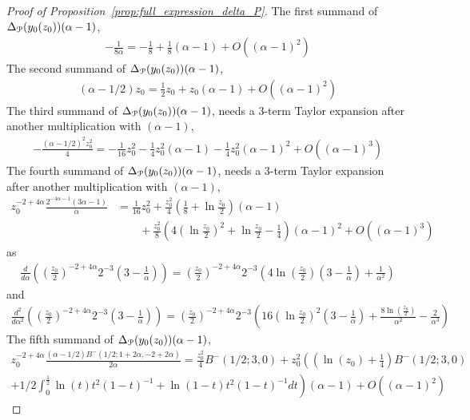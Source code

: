 \begin{proof}[Proof of Proposition~\ref{prop:full_expression_delta_P}]
The first summand of $\Delta_{{\mathcal P}}(y_0(z_0))(\alpha-1)$,
\begin{align*}
-\frac{1}{8 \alpha} = -\frac{1}{8}+\frac{1}{8}(\alpha-1) +O( (\alpha-1)^2)
\end{align*}
The second summand of $\Delta_{{\mathcal P}}(y_0(z_0))(\alpha-1)$,
\begin{align*}
(\alpha-1/2)z_0 = \frac{1}{2}z_0 +z_0 (\alpha-1)+O( (\alpha-1)^2)
\end{align*}
The third summand of $\Delta_{{\mathcal P}}(y_0(z_0))(\alpha-1)$, needs a 3-term Taylor expansion after another multiplication with $(\alpha-1)$,
\begin{align*}
- \frac{(\alpha - 1/2)^2 z_0^2}{4} = -\frac{1}{16}z_0^2 -\frac{1}{4}z_0^2(\alpha-1)-\frac{1}{4}z_0^2(\alpha-1)^2+O( (\alpha-1)^3)
\end{align*}
The fourth summand of $\Delta_{{\mathcal P}}(y_0(z_0))(\alpha-1)$, needs a  3-term Taylor expansion after another multiplication with $(\alpha-1)$,
\begin{align*}
z_0^{-2 + 4 \alpha} \frac{2^{-4 \alpha-1} (3 \alpha - 1)}{\alpha} &= \frac{1}{16}z_0^2 +\frac{z_0^2}{4}\left(\frac{1}{8}+\ln\frac{z_0}{2}\right)(\alpha-1)\\
&\qquad+\frac{z_0^2}{8}\left(4\left(\ln\frac{z_0}{2}\right)^2+\ln\frac{z_0}{2} - \frac{1}{4}\right)(\alpha-1)^2+O( (\alpha-1)^3)
\end{align*}
as
\begin{align*}
\frac{d}{d\alpha}\left( \left(\frac{z_0}{2}\right)^{-2+4\alpha} 2^{-3}\left(3-\frac{1}{\alpha}\right) \right) = \left(\frac{z_0}{2}\right)^{-2+4\alpha}2^{-3}\left(4\ln\left(\frac{z_0}{2}\right)\left(3-\frac{1}{\alpha}\right)+\frac{1}{\alpha^2}\right)
\end{align*}
and
\begin{align*}
\frac{d^2}{d\alpha^2}\left( \left(\frac{z_0}{2}\right)^{-2+4\alpha} 2^{-3}\left(3-\frac{1}{\alpha}\right) \right) = \left( \frac{z_0}{2} \right)^{-2+4\alpha}2^{-3}\left(16\left(\ln\frac{z_0}{2}\right)^2\left(3-\frac{1}{\alpha}\right)+\frac{8\ln(\frac{z_0}{2})}{\alpha^2}-\frac{2}{\alpha^3} \right)
\end{align*}
The fifth summand of $\Delta_{{\mathcal P}}(y_0(z_0))(\alpha-1)$,
\begin{align*}
z_0^{-2 + 4 \alpha} \frac{(\alpha - 
	1/2 ) B^-(1/2; 1 + 2 \alpha, 
	-2 + 2 \alpha)}{2\alpha} = \frac{z_0^2}{4} B^-(1/2;3,0) + z_0^2\left(\left(\ln(z_0)+\frac{1}{4}\right) B^-(1/2;3,0) \right. \\
 \left.+1/2\int_0^{\frac{1}{2}} \ln(t)t^2(1-t)^{-1}+\ln(1-t)t^2(1-t)^{-1}dt \right)  (\alpha-1)+O( (\alpha-1)^2 )

\end{align*}
\end{proof}
